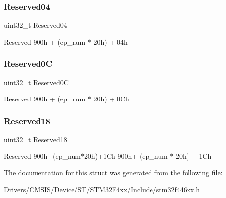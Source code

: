 \subsubsection{\texorpdfstring{Reserved04}{Reserved04}}
{\footnotesize\ttfamily uint32\+\_\+t Reserved04}

Reserved 900h + (ep\+\_\+num $\ast$ 20h) + 04h \mbox{\label{struct_u_s_b___o_t_g___i_n_endpoint_type_def_a1bcc039378b4ed4ac1261a0a758c3d1d}} 
\subsubsection{\texorpdfstring{Reserved0C}{Reserved0C}}
{\footnotesize\ttfamily uint32\+\_\+t Reserved0C}

Reserved 900h + (ep\+\_\+num $\ast$ 20h) + 0\+Ch \mbox{\label{struct_u_s_b___o_t_g___i_n_endpoint_type_def_a716e172ed03ae049eb501ad83207b4ed}} 
\subsubsection{\texorpdfstring{Reserved18}{Reserved18}}
{\footnotesize\ttfamily uint32\+\_\+t Reserved18}

Reserved 900h+(ep\+\_\+num$\ast$20h)+1\+Ch-\/900h+ (ep\+\_\+num $\ast$ 20h) + 1\+Ch 

The documentation for this struct was generated from the following file\+:\begin{DoxyCompactItemize}
\item 
Drivers/\+C\+M\+S\+I\+S/\+Device/\+S\+T/\+S\+T\+M32\+F4xx/\+Include/\mbox{\hyperlink{stm32f446xx_8h}{stm32f446xx.\+h}}\end{DoxyCompactItemize}
